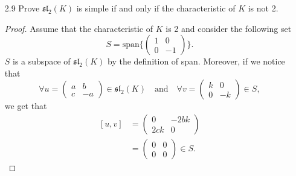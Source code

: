 \documentclass[12pt]{article}
\theoremstyle{definition}
\begin{document}
\begin{enumerate}
\begin{proof}
                the definition of a Lie algebra, $L$ is a vector space over
                some field $K$. As such, it is an abelian group with respect to
                addition and a magma with respect to $[\cdot, \cdot]$. By the
                biliearity of $[\cdot, \cdot]$, it follows that $[kx, ly]=k[x,
                ly]=l[kx, y ]=(kl)[x, y]$. Thus, $(L, [\cdot, \cdot])$ is
                a $K$-algebra.
            \end{proof}
        \item[2.9] Prove $\mathfrak{sl}_{2}(K)$ is simple if and only if the
            characteristic of $K$ is not 2.
            \begin{proof}
                Assume that the characteristic of $K$ is 2 and consider the
                following set
                \begin{equation*}
                    S = \text{span}\{\begin{pmatrix} 1&0\\0&-1 \end{pmatrix}
                    \}.
                \end{equation*}
                $S$ is a subspace of $\mathfrak{sl}_{2}(K)$ by the definition
                of span. Moreover, if we notice that 
                \begin{equation*}
                    \forall u=\begin{pmatrix}a&b\\c&-a
                    \end{pmatrix}\in\mathfrak{sl}_{2}(K)\quad
                    \text{and}\quad\forall v=\begin{pmatrix}k&0\\0&-k\end{pmatrix}\in
                    S, 
                \end{equation*}
                we get that 
                \begin{equation*}
                    \begin{split}
                        [u, v] &= \begin{pmatrix} 0&-2bk\\2ck&0\end{pmatrix} \\
                        &=\begin{pmatrix}0&0\\0&0 \end{pmatrix} \in S.
                    \end{split}

\end{equation*}
\end{proof}
\end{enumerate}
\end{document}
